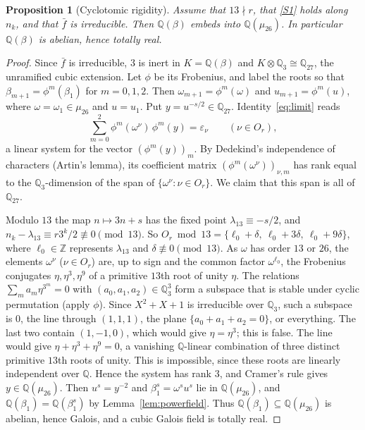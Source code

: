 \documentclass[11pt,a4paper]{article}
\newtheorem{proposition}[theorem]{Proposition}
\theoremstyle{definition}
\theoremstyle{remark}
\newcommand{\Q}{\mathbb{Q}}
\newcommand{\Z}{\mathbb{Z}}
\newcommand{\Qt}{\mathbb{Q}_3}
\begin{document}
\begin{proposition}[Cyclotomic rigidity]\label{prop:rigidity}
Assume that $13\nmid r$, that \ref{S1} holds along $n_k$, and that $\bar f$ is irreducible.
Then $\Q(\beta)$ embeds into $\Q(\mu_{26})$. In particular $\Q(\beta)$ is abelian, hence totally real.
\end{proposition}
\begin{proof}
Since $\bar f$ is irreducible, $3$ is inert in $K=\Q(\beta)$ and $K\otimes\Qt\cong\Q_{27}$, the unramified cubic extension.
Let $\phi$ be its Frobenius, and label the roots so that $\beta_{m+1}=\phi^m(\beta_1)$ for $m=0,1,2$.
Then $\omega_{m+1}=\phi^m(\omega)$ and $u_{m+1}=\phi^m(u)$, where $\omega=\omega_1\in\mu_{26}$ and $u=u_1$.
Put $y=u^{-s/2}\in\Q_{27}$.
Identity~\eqref{eq:limit} reads
\[
 \sum_{m=0}^{2}\phi^m(\omega^{\nu})\,\phi^m(y)=\varepsilon_\nu\qquad(\nu\in O_r),
\]
a linear system for the vector $(\phi^m(y))_{m}$.
By Dedekind's independence of characters (Artin's lemma), its coefficient matrix $(\phi^m(\omega^\nu))_{\nu,m}$ has rank equal to the $\Qt$-dimension of the span of $\{\omega^\nu:\nu\in O_r\}$.
We claim that this span is all of $\Q_{27}$.

Modulo $13$ the map $n\mapsto3n+s$ has the fixed point $\lambda_{13}\equiv-s/2$, and $n_k-\lambda_{13}\equiv r3^k/2\not\equiv0\pmod{13}$.
So $O_r\bmod13=\{\ell_0+\delta,\ \ell_0+3\delta,\ \ell_0+9\delta\}$, where $\ell_0\in\Z$ represents $\lambda_{13}$ and $\delta\not\equiv0\pmod{13}$.
As $\omega$ has order $13$ or $26$, the elements $\omega^\nu$ ($\nu\in O_r$) are, up to sign and the common factor $\omega^{\ell_0}$, the Frobenius conjugates $\eta,\eta^3,\eta^9$ of a primitive $13$th root of unity $\eta$.
The relations $\sum_ma_m\eta^{3^m}=0$ with $(a_0,a_1,a_2)\in\Qt^3$ form a subspace that is stable under cyclic permutation (apply $\phi$).
Since $X^2+X+1$ is irreducible over $\Qt$, such a subspace is $0$, the line through $(1,1,1)$, the plane $\{a_0+a_1+a_2=0\}$, or everything.
The last two contain $(1,-1,0)$, which would give $\eta=\eta^3$; this is false.
The line would give $\eta+\eta^3+\eta^9=0$, a vanishing $\Q$-linear combination of three distinct primitive $13$th roots of unity. This is impossible, since these roots are linearly independent over $\Q$.
Hence the system has rank $3$, and Cramer's rule gives $y\in\Q(\mu_{26})$.
Then $u^s=y^{-2}$ and $\beta_1^s=\omega^su^s$ lie in $\Q(\mu_{26})$, and $\Q(\beta_1)=\Q(\beta_1^s)$ by Lemma~\ref{lem:powerfield}.
Thus $\Q(\beta_1)\subseteq\Q(\mu_{26})$ is abelian, hence Galois, and a cubic Galois field is totally real.
\end{proof}
\end{document}
